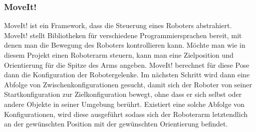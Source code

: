 \subsubsection{MoveIt!} %
\label{ssub:moveit}
MoveIt! \cite{MoveIt} ist ein Framework, dass die Steuerung eines Roboters abstrahiert. MoveIt! stellt Bibliotheken für verschiedene Programmiersprachen bereit, mit denen man die Bewegung des Roboters kontrollieren kann. Möchte man wie in diesem Projekt einen Roboterarm steuern, kann man eine Zielposition und Orientierung für die Spitze des Arms angeben. MoveIt! berechnet für diese Pose dann die Konfiguration der Robotergelenke. Im nächsten Schritt wird dann eine Abfolge von Zwischenkonfigurationen gesucht, damit sich der Roboter von seiner Startkonfiguration zur Zielkonfiguration bewegt, ohne dass er sich selbst oder andere Objekte in seiner Umgebung berührt. Existiert eine solche Abfolge von Konfigurationen, wird diese ausgeführt sodass sich der Roboterarm letztendlich an der gewünschten Position mit der gewünschten Orientierung befindet.